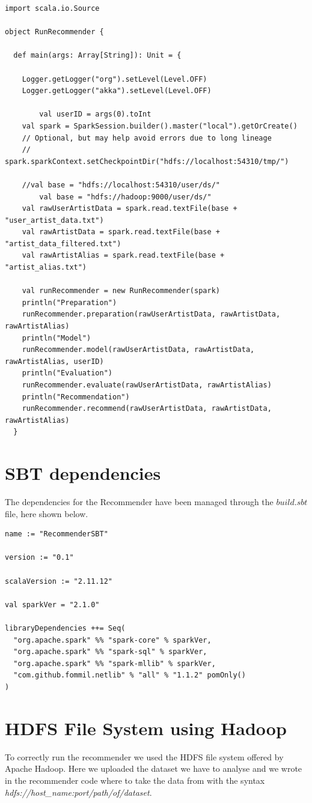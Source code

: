 \documentclass[11pt,a4paper,titlepage]{article}
\begin{document}
\begin{lstlisting}[style=myScalastyle]
import scala.io.Source

object RunRecommender {

  def main(args: Array[String]): Unit = {

    Logger.getLogger("org").setLevel(Level.OFF)
    Logger.getLogger("akka").setLevel(Level.OFF)

        val userID = args(0).toInt
    val spark = SparkSession.builder().master("local").getOrCreate()
    // Optional, but may help avoid errors due to long lineage
    // spark.sparkContext.setCheckpointDir("hdfs://localhost:54310/tmp/")

    //val base = "hdfs://localhost:54310/user/ds/"
        val base = "hdfs://hadoop:9000/user/ds/"
    val rawUserArtistData = spark.read.textFile(base + "user_artist_data.txt")
    val rawArtistData = spark.read.textFile(base + "artist_data_filtered.txt")
    val rawArtistAlias = spark.read.textFile(base + "artist_alias.txt")

    val runRecommender = new RunRecommender(spark)
    println("Preparation")
    runRecommender.preparation(rawUserArtistData, rawArtistData, rawArtistAlias)
    println("Model")
    runRecommender.model(rawUserArtistData, rawArtistData, rawArtistAlias, userID)
    println("Evaluation")
    runRecommender.evaluate(rawUserArtistData, rawArtistAlias)
    println("Recommendation")
    runRecommender.recommend(rawUserArtistData, rawArtistData, rawArtistAlias)
  }
\end{lstlisting}
\section{SBT dependencies}
The dependencies for the Recommender have been managed through the $build.sbt$ file, here shown below.

\begin{lstlisting}[style=myScalastyle]
name := "RecommenderSBT"

version := "0.1"

scalaVersion := "2.11.12"

val sparkVer = "2.1.0"

libraryDependencies ++= Seq(
  "org.apache.spark" %% "spark-core" % sparkVer,
  "org.apache.spark" %% "spark-sql" % sparkVer,
  "org.apache.spark" %% "spark-mllib" % sparkVer,
  "com.github.fommil.netlib" % "all" % "1.1.2" pomOnly()
)
\end{lstlisting}
\section{HDFS File System using Hadoop}
To correctly run the recommender we used the HDFS file system offered by Apache Hadoop.
Here we uploaded the dataset we have to analyse and we wrote in the recommender code where to take the data from with the syntax \textit{hdfs://host\_name:port/path/of/dataset}.
\end{document}
